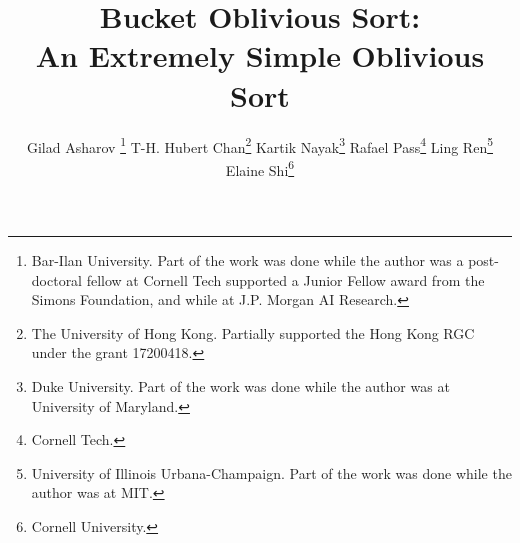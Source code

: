 \documentclass[twoside,leqno,twocolumn]{article}
\begin{document}
\title{\bf Bucket Oblivious Sort: \\An Extremely Simple Oblivious Sort}

\author{Gilad Asharov \thanks{Bar-Ilan University. Part of the work was done while the author was a post-doctoral fellow at Cornell Tech supported a Junior Fellow award from the Simons Foundation, and while at J.P. Morgan AI Research.} \quad
T-H. Hubert Chan\thanks{The University of Hong Kong. Partially supported the Hong Kong RGC under the grant 17200418.} \quad
Kartik Nayak\thanks{Duke University. Part of the work was done while the author was at University of Maryland.} \quad
Rafael Pass\thanks{Cornell Tech.} \quad
Ling Ren\thanks{University of Illinois Urbana-Champaign. Part of the work was done while the author was at MIT.} \quad
Elaine Shi\thanks{Cornell University.}}

\newcommand{\rl}[1]{{\footnotesize\color{orange}[Ling: #1]}}

\date{}

\maketitle


\begin{abstract}

\end{abstract}









\appendix

%
\end{document}

